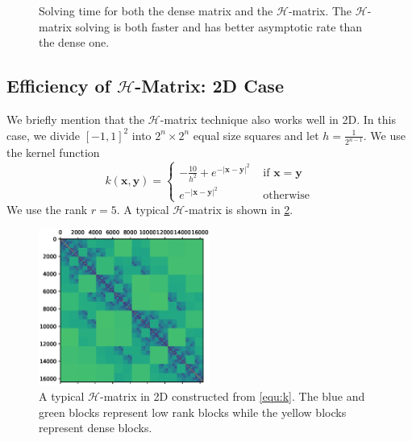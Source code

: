 \documentclass[3p,,preprint,12pt]{elsarticle}
\newcommand{\bx}[0]{\mathbf{x}}
\theoremstyle{definition}
\newcommand{\by}[0]{\mathbf{y}}
\begin{document}
\begin{figure}[htpb]
\centering
\scalebox{0.6}{}
\caption{Solving time for both the dense matrix and the $\mathcal{H}$-matrix. The $\mathcal{H}$-matrix solving is both faster and has better asymptotic rate than the dense one.}
\label{fig:solve}
\end{figure}

\subsection{Efficiency of $\mathcal{H}$-Matrix: 2D Case}

We briefly mention that the $\mathcal{H}$-matrix technique also works well in 2D. In this case, we divide $[-1,1]^2$ into $2^n\times 2^n$ equal size squares and let $h=\frac{1}{2^{n-1}}$. We use the kernel function
\begin{equation}\label{equ:k}
	k(\bx,\by) = \begin{cases}
		-\frac{10}{h^2} + e^{-|\bx-\by|^2} & \mbox{ if } \bx=\by\\
		e^{-|\bx-\by|^2} & \mbox{ otherwise}
	\end{cases}
\end{equation}
We use the rank $r=5$. A typical $\mathcal{H}$-matrix is shown in \cref{fig:2d}.

\begin{figure}[H] %
\centering
\includegraphics[width=0.5\textwidth,keepaspectratio]{figures/2D}
\caption{A typical $\mathcal{H}$-matrix in 2D constructed from \cref{equ:k}. The blue and green blocks represent low rank blocks while the yellow blocks represent dense blocks.}
\label{fig:2d}
\end{figure}
\end{document}
